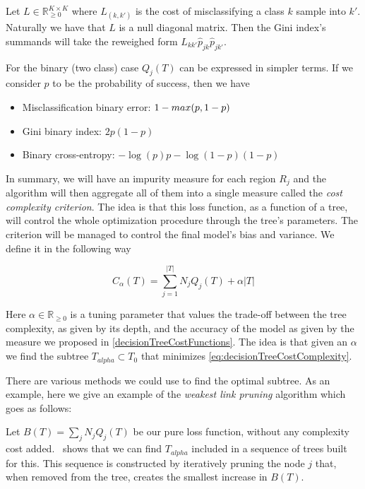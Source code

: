 Let $L \in \mathbb R_{\ge 0}^{K \times K}$ where $L_{(k,k')}$ is the cost of misclassifying a class $k$ sample into $k'$. Naturally we have that $L$ is a null diagonal matrix. Then the Gini index's summands will take the reweighed form $L_{kk'} \hat{p}_{jk} \hat{p}_{jk'}$.

For the binary (two class) case $Q_j(T)$ can be expressed in simpler terms. If we consider $p$ to be the probability of success, then we have

\begin{itemize}
\item Misclassification binary error: $1 - \\max(p, 1-p)$
\item Gini binary index: $ 2p(1-p) $
\item Binary cross-entropy: $ -\log(p)p - \log(1- p)(1-p) $
\end{itemize}\label{decisionTreeCostFunctions}

In summary, we will have an impurity measure for each region $R_j$ and the algorithm will then aggregate all of them into a single measure called the \textit{cost complexity criterion}. The idea is that this loss function, as a function of a tree, will control the whole optimization procedure through the tree's parameters. The criterion will be managed to control the final model's bias and variance. We define it in the following way

\begin{equation}
C_\alpha(T) = \sum_{j=1}^{|T|} N_j Q_j(T) + \alpha|T|
\end{equation}\label{eq:decisionTreeCostComplexity}


Here $\alpha \in \mathbb{R}_{\geq 0}$ is a tuning parameter that values the trade-off between the tree complexity, as given by its depth, and the accuracy of the model as given by the measure we proposed in \cref{decisionTreeCostFunctions}. The idea is that given an $\alpha$ we find the subtree $T_{alpha} \subset T_0$ that minimizes \cref{eq:decisionTreeCostComplexity}.

There are various methods we could use to find the optimal subtree. As an example, here we give an example of the \textit{weakest link pruning} algorithm which goes as follows:

Let $B(T) = \sum_{j} N_j Q_j(T) $ be our pure loss function, without any complexity cost added.~\textcite{breiman-cart84} shows that we can find $T_{alpha}$ included in a sequence of trees built for this. This sequence is constructed by iteratively pruning the node $j$ that, when removed from the tree, creates the smallest increase in $B(T)$.

